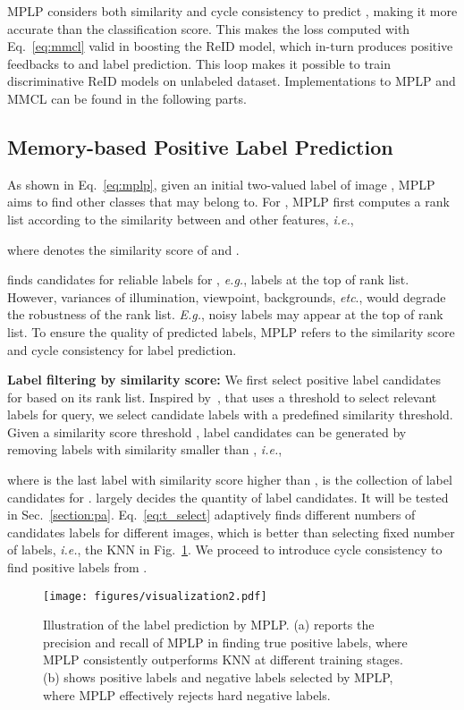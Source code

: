 \documentclass[10pt,twocolumn,letterpaper]{article}
\begin{document}
MPLP considers both similarity and cycle consistency to predict , making it more accurate than the classification score. This makes the loss computed with Eq.~\eqref{eq:mmcl} valid in boosting the ReID model, which in-turn produces positive feedbacks to  and label prediction. This loop makes it possible to train discriminative ReID models on unlabeled dataset. Implementations to MPLP and MMCL can be found in the following parts.

\subsection{Memory-based Positive Label Prediction}\label{section:mplp}

As shown in Eq.~\eqref{eq:mplp}, given an initial two-valued label  of image , MPLP aims to find other classes that  may belong to. For , MPLP first computes a rank list  according to the similarity between  and other features, \emph{i.e.},


where  denotes the similarity score of  and .

 finds candidates for reliable labels for , \emph{e.g.}, labels at the top of rank list. However, variances of illumination, viewpoint, backgrounds, \emph{etc}., would degrade the robustness of the rank list. \emph{E.g.}, noisy labels may appear at the top of rank list. To ensure the quality of predicted labels, MPLP refers to the similarity score and cycle consistency for label prediction.


\textbf{Label filtering by similarity score:} We first select positive label candidates for  based on its rank list. Inspired by~\cite{zhang2013review}, that uses a threshold to select relevant labels for query, we select candidate labels with a predefined similarity threshold. Given a similarity score threshold ,  label candidates can be generated by removing labels with similarity smaller than , \emph{i.e.},

where  is the last label with similarity score higher than ,  is the collection of label candidates for .  largely decides the quantity of label candidates. It will be tested in Sec.~\ref{section:pa}. Eq.~\eqref{eq:t_select} adaptively finds different numbers of candidates labels for different images, which is better than selecting fixed number of labels, \emph{i.e.}, the KNN in Fig.~\ref{fig:visualization}. We proceed to introduce cycle consistency to find positive labels from .



\begin{figure}
\begin{center}
\texttt{[image: figures/visualization2.pdf]}
\end{center}
 \caption{Illustration of the label prediction by MPLP. (a) reports the precision and recall of MPLP in finding true positive labels, where MPLP consistently outperforms KNN at different training stages. (b) shows positive labels and negative labels selected by MPLP, where MPLP effectively rejects hard negative labels.}
\vspace{-1mm}
\label{fig:visualization}
\end{figure}
\end{document}
